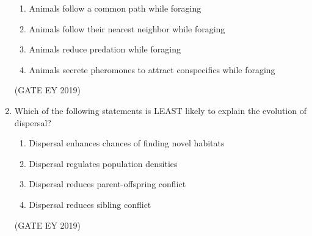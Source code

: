 \documentclass[journal,12pt,onecolumn]{IEEEtran}
\theoremstyle{remark}
\begin{document}
\begin{enumerate}[resume]
\begin{enumerate}
   
\item Animals follow a common path while foraging 
\item Animals follow their nearest neighbor while foraging   
\item Animals reduce predation while foraging   
\item Animals secrete pheromones to attract conspecifics while foraging 
  
\end{enumerate}

 

\hfill{(GATE EY 2019)}
\item Which of the following statements is LEAST likely to explain the evolution of dispersal?  

\begin{enumerate}
 
\item Dispersal enhances chances of finding novel habitats 
\item  Dispersal regulates population densities
\item  Dispersal reduces parent-offspring conflict   
\item Dispersal reduces sibling conflict 

\end{enumerate}


\hfill{(GATE EY 2019)}
\end{enumerate}
\end{document}
